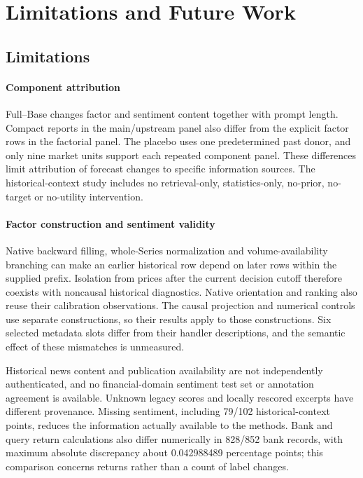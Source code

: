 \section{Limitations and Future Work}
\label{sec:limitations}

\subsection{Limitations}
\paragraph{Component attribution}
Full--Base changes factor and sentiment content together with prompt length. Compact reports in the main/upstream panel also differ from the explicit factor rows in the factorial panel. The placebo uses one predetermined past donor, and only nine market units support each repeated component panel. These differences limit attribution of forecast changes to specific information sources. The historical-context study includes no retrieval-only, statistics-only, no-prior, no-target or no-utility intervention.

\paragraph{Factor construction and sentiment validity}
Native backward filling, whole-Series normalization and volume-availability branching can make an earlier historical row depend on later rows within the supplied prefix. Isolation from prices after the current decision cutoff therefore coexists with noncausal historical diagnostics. Native orientation and ranking also reuse their calibration observations. The causal projection and numerical controls use separate constructions, so their results apply to those constructions. Six selected metadata slots differ from their handler descriptions, and the semantic effect of these mismatches is unmeasured.

Historical news content and publication availability are not independently authenticated, and no financial-domain sentiment test set or annotation agreement is available. Unknown legacy scores and locally rescored excerpts have different provenance. Missing sentiment, including 79/102 historical-context points, reduces the information actually available to the methods. Bank and query return calculations also differ numerically in 828/852 bank records, with maximum absolute discrepancy about 0.042988489 percentage points; this comparison concerns returns rather than a count of label changes.

